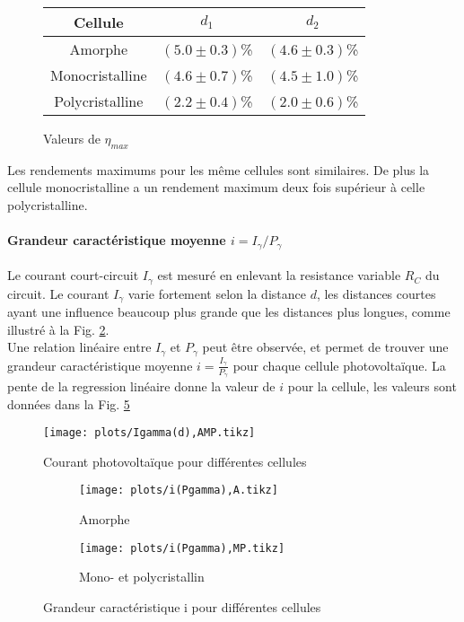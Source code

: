 \begin{figure}[h]
    \centering
    \begin{tabulary}{0.7\linewidth}{C C C}
        \toprule
        Cellule & \(d_1\) & \(d_2\) \\
        \midrule
        Amorphe & \((5.0 \pm 0.3)\)\% & \((4.6 \pm 0.3)\)\% \\
        Monocristalline & \((4.6 \pm 0.7)\)\% & \((4.5 \pm 1.0)\)\% \\
        Polycristalline & \((2.2 \pm 0.4)\)\% & \((2.0 \pm 0.6)\)\% \\
        \bottomrule
    \end{tabulary}
    \caption{Valeurs de \(\eta_{max}\)}
    \label{tab:rendementmax}
\end{figure}

Les rendements maximums pour les même cellules sont similaires. De plus la cellule monocristalline a un rendement maximum deux fois supérieur à celle polycristalline.

\paragraph*{Grandeur caractéristique moyenne \(i = I_\gamma/P_\gamma\)}
Le courant court-circuit \(I_\gamma\) est mesuré en enlevant la resistance variable \(R_C\) du circuit. Le courant \(I_\gamma\) varie fortement selon la distance \(d\), les distances courtes ayant une influence beaucoup plus grande que les distances plus longues, comme illustré à la Fig. \ref{plot:4}. \\
Une relation linéaire entre \(I_\gamma\) et \(P_\gamma\) peut être observée, et permet de trouver une grandeur caractéristique moyenne \(i = \frac{I_\gamma}{P_\gamma}\) pour chaque cellule photovoltaïque. La pente de la regression linéaire donne la valeur de \(i\) pour la cellule, les valeurs sont données dans la Fig. \ref{plot:5}

\begin{figure}[h]
    \centering
    \texttt{[image: plots/Igamma(d),AMP.tikz]}
    \caption{Courant photovoltaïque pour différentes cellules}
    \label{plot:4}
\end{figure}

\begin{figure}[h]
    \centering
    \begin{subfigure}[t]{0.48\linewidth}
        \centering
        \texttt{[image: plots/i(Pgamma),A.tikz]}
        \caption{Amorphe}
        \label{plot:5a}
    \end{subfigure}
    \begin{subfigure}[t]{0.48\linewidth}
        \centering
        \texttt{[image: plots/i(Pgamma),MP.tikz]}
        \caption{Mono- et polycristallin}
        \label{plot:5b}
    \end{subfigure}
    \caption{Grandeur caractéristique i pour différentes cellules}
    \label{plot:5}
\end{figure}

